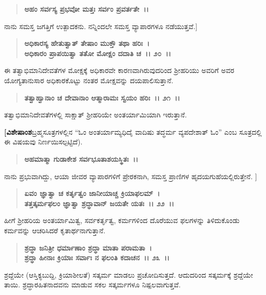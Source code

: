 \begin{verse}
\textbf{ಅಹಂ ಸರ್ವಸ್ಯ ಪ್ರಭವೋ ಮತ್ತಃ ಸರ್ವಂ ಪ್ರವರ್ತತೇ~।।} 
\end{verse}

ನಾನು ಸಮಸ್ತ ಜಗತ್ತಿಗೆ ಉತ್ಪಾದಕನು. ನನ್ನಿಂದಲೇ ಸಮಸ್ತ ವ್ಯಾಪಾರಗಳೂ ನಡೆಯುತ್ತವೆ.]

\begin{verse}
\textbf{ಅಧಿಕಾರಸ್ಯ ಹೇತುತ್ವಾತ್ ತೇಷಾಂ ಮುಕ್ತೌ ತಥಾ ಹರಿಃ~।}\\\textbf{ಅಧಿಕಾರಂ ಪ್ರಾಪಯಿತ್ವಾ ತತೋ ಮೋಕ್ಷಂ ದದಾತಿ ಚ~।। ೨೦~।।}
\end{verse}

ಈ ತತ್ವಾಭಿಮಾನಿದೇವತೆಗಳ ಮೋಕ್ಷಕ್ಕೆ ಅಧಿಕಾರವೇ ಕಾರಣವಾಗಿರುವುದರಿಂದ ಶ‍್ರೀಹರಿಯು ಅವರಿಗೆ ಅವರ ಯೋಗ್ಯತಾನುಸಾರ ಅಧಿಕಾರಕೊಟ್ಟು ನಂತರ ಮೋಕ್ಷವನ್ನು ದಯಪಾಲಿಸುತ್ತಾನೆ.

\begin{verse}
\textbf{ತತ್ವಾಹ್ವಾನಾಂ ಚ ದೇವಾನಾಂ ಆತ್ಮಾರಾಮಃ ಸ್ವಯಂ ಹರಿಃ~।। ೨೧~।।}
\end{verse}

ತತ್ವಾಭಿಮಾನಿದೇವತೆಗಳಲ್ಲಿ ಸಾಕ್ಷಾತ್ ಶ‍್ರೀಹರಿಯೇ ಅಂತರ್ಯಾಮಿಯಾಗಿ ಇರುತ್ತಾನೆ.

\textbf{[ವಿಶೇಷಾಂಶ}ಬ್ರಹ್ಮಸೂತ್ರಗಳಲ್ಲಿನ “ಓಂ ಅಂತರ್ಯಾಮ್ಯಧಿದೈ ವಾದಿಷು ತದ್ಧರ್ಮ ವ್ಯಪದೇಶಾತ್ ಓಂ” ಎಂಬ ಸೂತ್ರದಲ್ಲಿ ಈ ವಿಷಯವು ನಿರ್ಣಯಿಸಲ್ಪಟ್ಟಿದೆ).

\begin{verse}
\textbf{ಅಹಮಾತ್ಮಾ ಗುಡಾಕೇಶ ಸರ್ವಭೂತಾಶಯಸ್ಥಿತಃ~।।} 
\end{verse}

ನಾನು ಪ್ರಭುವಾಗಿದ್ದು, ಆಯಾ ಜೀವರ ವ್ಯಾಪಾರಗಳಿಗೆ ಪ್ರೇರಕನಾಗಿ, ಸಮಸ್ತ ಪ್ರಾಣಿಗಳ ಹೃದಯಗುಹೆಯಲ್ಲಿರುತ್ತೇನೆ. ]

\begin{verse}
\textbf{ಏವಂ ಜ್ಞಾತ್ವಾ ಚ ಕರ್ತೃತ್ವಂ ಜಾನೀಯಾಚ್ಚ ಕ್ರಿಯಾಫಲಮ್~।}\\\textbf{ತತ್ತತ್ಕರ್ಮಫಲಂ ಜ್ಞಾತ್ವಾ ಶ್ರದ್ಧಾವಾನ್ ಜಯತೇ ಯತಃ~।। ೨೨~।।}
\end{verse}

ಹೀಗೆ ಶ‍್ರೀಹರಿಯ ಅಂತರ್ಯಾಮಿತ್ವ, ಸರ್ವಕರ್ತೃತ್ವ, ಕರ್ಮಗಳಿಂದ ದೊರೆಯುವ ಫಲಗಳನ್ನು ತಿಳಿದುಕೊಂಡು ಕರ್ಮವನ್ನು ಆಚರಿಸಿದರೆ ಕೃತಾರ್ಥನಾಗುತ್ತಾನೆ.

\begin{verse}
\textbf{ಶ್ರದ್ಧಾ ಜನಿತ್ರೀ ಧರ್ಮಾಣಾಂ ಶ್ರದ್ಧಾ ಮಾತಾ ಪರಾಮತಾ~।}\\\textbf{ಶ್ರದ್ಧಾ ಹೀನಾಃ ಕ್ರಿಯಾಃ ಸರ್ವಾಃ ನ ಫಲಂತಿ ಕದಾಚನ~।। ೨೩~।।}
\end{verse}

ಶ್ರದ್ದೆಯೇ (ಆಸ್ತಿಕ್ಯಬುದ್ದಿ, ಕ್ರಿಯಾಶೀಲತೆ) ಸತ್ಕರ್ಮ ಮಾಡಲು ಪ್ರಚೋದಿಸುತ್ತದೆ. ಆದುದರಿಂದ ಸತ್ಕರ್ಮಕ್ಕೆ ಶ್ರದ್ದೆಯೇ ತಾಯಿ. ಶ್ರದ್ಧಾರಹಿತನಾದವನು ಮಾಡುವ ಸಕಲ ಸತ್ಕರ್ಮಗಳೂ ನಿಷ್ಪಲವಾಗುತ್ತವೆ.

